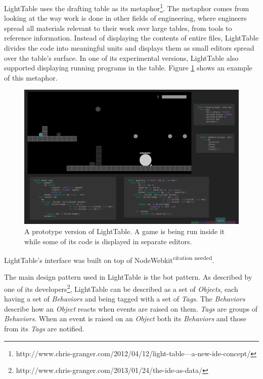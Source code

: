 \documentclass{./llncs2e/llncs}
\begin{document}
LightTable uses the drafting table as its metaphor\footnote{http://www.chris-granger.com/2012/04/12/light-table---a-new-ide-concept/}. The metaphor comes from looking at the way work is done in other fields of engineering, where engineers spread all materials relevant to their work over large tables, from tools to reference information. 
Instead of displaying the contents of entire files, LightTable divides the code into meaningful units and displays them as small editors spread over the table's surface. In one of its experimental versions, LightTable also supported displaying running programs in the table. Figure \ref{fig:lt:draft:table} shows an example of this metaphor.


\begin{figure}
  \centering
  \includegraphics[width=1.0\textwidth]{img/lt_game_example}
    \caption{A prototype version of LightTable. A game is being run inside it while some of its code is displayed in separate editors.}
  \label{fig:lt:draft:table}
\end{figure} 

LightTable's interface was built on top of NodeWebkit\textsuperscript{citation needed}.

The main design pattern used in LightTable is the \ac{bot} pattern. As described by one of its developers\footnote{http://www.chris-granger.com/2013/01/24/the-ide-as-data/}, LightTable can be described as a set of \emph{Objects}, each having a set of \emph{Behaviors} and being tagged with a set of \emph{Tags}. The \emph{Behaviors} describe how an \emph{Object} reacts when events are raised on them. \emph{Tags} are groups of \emph{Behaviors}. When an event is raised on an \emph{Object} both its \emph{Behaviors} and those from its \emph{Tags} are notified.
\end{document}
